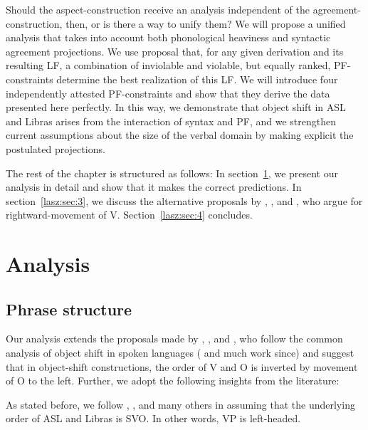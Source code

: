 \documentclass[output=paper,colorlinks,citecolor=brown,
]{langscibook}
\begin{document}
Should the aspect-construction receive an analysis independent
of the agreement-construction, then, or is there a way to unify them?
We will propose a unified analysis that takes into account both
phonological heaviness and syntactic agreement projections. We use
 proposal that, for any given
derivation and its resulting LF, a combination of inviolable and
violable, but equally ranked, PF-constraints determine the best
realization of this LF. We will introduce four independently attested
PF-constraints and show that they derive the data presented here
perfectly. In this way, we demonstrate that object shift in ASL and
Libras arises from the interaction of syntax and PF, and we strengthen
current assumptions about the size of the verbal domain by making
explicit the postulated projections.

The rest of the chapter is structured as follows: In section~\ref{lasz:sec:2}, we
present our analysis in detail and show that it makes the correct
predictions. In section~\ref{lasz:sec:3}, we discuss the alternative proposals by
\citet{Fischer.Janis.1992}, \citet{Matsuoka.1997}, and \citet{Braze.2004}, who
argue for rightward-movement of V. Section~\ref{lasz:sec:4} concludes.

\section{Analysis}
\label{lasz:sec:2}
    
\subsection{Phrase structure}
\label{lasz:sec:21}

Our analysis extends the proposals made by \citet{Quadros.etal.2004}, 
\citet{Quadros.DLM.2010}, and \citet{Gokgoz.2013}, who follow the
common analysis of object shift in spoken languages (\citealp{Holmberg:1986}
and much work since) and suggest that in object-shift constructions,
the order of V and O is inverted by movement of O to the left. Further,
we adopt the following insights from the literature:

As stated before, we follow \citet{Fischer.1975}, \citet{Liddell.1980},
\citet{Quadros.1999} and many others in assuming that the underlying order
of ASL and Libras is SVO. In other words, VP is left-headed.
\end{document}
